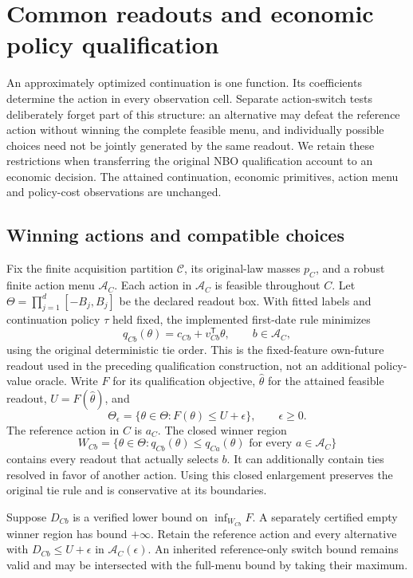 \section{Common readouts and economic policy qualification}\label{sec:compatible84}
An approximately optimized continuation is one function. Its coefficients determine the action in every observation cell. Separate action-switch tests deliberately forget part of this structure: an alternative may defeat the reference action without winning the complete feasible menu, and individually possible choices need not be jointly generated by the same readout. We retain these restrictions when transferring the original NBO qualification account to an economic decision. The attained continuation, economic primitives, action menu and policy-cost observations are unchanged.

\subsection{Winning actions and compatible choices}
Fix the finite acquisition partition $\mathcal C$, its original-law masses $p_C$, and a robust finite action menu $\mathcal A_C$. Each action in $\mathcal A_C$ is feasible throughout $C$. Let $\Theta=\prod_{j=1}^d[-B_j,B_j]$ be the declared readout box. With fitted labels and continuation policy $\tau$ held fixed, the implemented first-date rule minimizes
\[
 q_{Cb}(\theta)=c_{Cb}+v_{Cb}^{\mathsf T}\theta,
 \qquad b\in\mathcal A_C,
\]
using the original deterministic tie order. This is the fixed-feature own-future readout used in the preceding qualification construction, not an additional policy-value oracle. Write $F$ for its qualification objective, $\widehat\theta$ for the attained feasible readout, $U=F(\widehat\theta)$, and
\[
 \Theta_\epsilon=\{\theta\in\Theta:F(\theta)\le U+\epsilon\},
 \qquad \epsilon\ge0.
\]
The reference action in $C$ is $a_C$. The closed winner region
\begin{equation}\label{eq:winner84}
 W_{Cb}=\{\theta\in\Theta:q_{Cb}(\theta)\le q_{Ca}(\theta)
                     \text{ for every }a\in\mathcal A_C\}
\end{equation}
contains every readout that actually selects $b$. It can additionally contain ties resolved in favor of another action. Using this closed enlargement preserves the original tie rule and is conservative at its boundaries.

Suppose $D_{Cb}$ is a verified lower bound on $\inf_{W_{Cb}}F$. A separately certified empty winner region has bound $+\infty$. Retain the reference action and every alternative with $D_{Cb}\le U+\epsilon$ in $\mathcal A_C(\epsilon)$. An inherited reference-only switch bound remains valid and may be intersected with the full-menu bound by taking their maximum.

